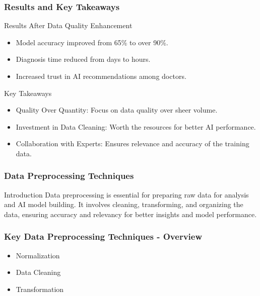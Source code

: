 \documentclass[aspectratio=169]{beamer}
\begin{document}
\begin{frame}[fragile]
    \frametitle{Results and Key Takeaways}
    \begin{block}{Results After Data Quality Enhancement}
        \begin{itemize}
            \item Model accuracy improved from 65\% to over 90\%.
            \item Diagnosis time reduced from days to hours.
            \item Increased trust in AI recommendations among doctors.
        \end{itemize}
    \end{block}

    \begin{block}{Key Takeaways}
        \begin{itemize}
            \item Quality Over Quantity: Focus on data quality over sheer volume.
            \item Investment in Data Cleaning: Worth the resources for better AI performance.
            \item Collaboration with Experts: Ensures relevance and accuracy of the training data.
        \end{itemize}
    \end{block}
\end{frame}

\begin{frame}
    \frametitle{Data Preprocessing Techniques}
    \begin{block}{Introduction}
        Data preprocessing is essential for preparing raw data for analysis and AI model building. It involves cleaning, transforming, and organizing the data, ensuring accuracy and relevancy for better insights and model performance.
    \end{block}
\end{frame}

\begin{frame}[fragile]
    \frametitle{Key Data Preprocessing Techniques - Overview}
    \begin{itemize}
        \item Normalization
        \item Data Cleaning
        \item Transformation
    \end{itemize}
\end{frame}
\end{document}

